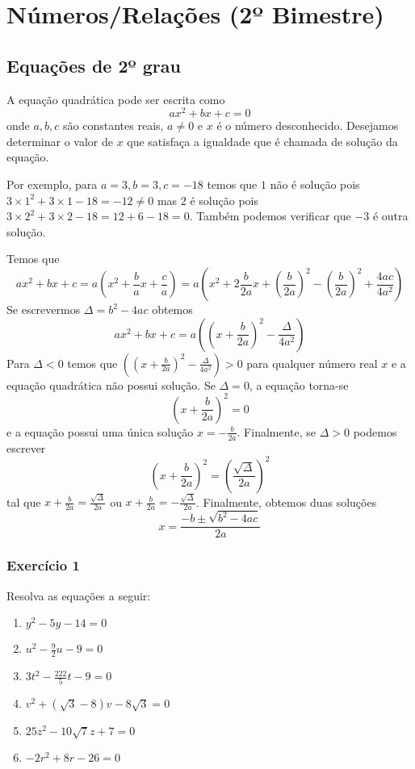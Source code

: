 \chapter{Números/Relações (2º Bimestre)}

\section{Equações de 2º grau}

A equação quadrática pode ser escrita como
$$a x^2 + b x + c = 0$$
onde $a, b, c$ são constantes reais,
$a \neq 0$ e $x$ é o número desconhecido.
Desejamos determinar o valor de $x$ que satisfaça a igualdade
que é chamada de solução da equação.

Por exemplo,
para $a=3, b=3, c=-18$ temos que
$1$ não é solução pois
$3 \times 1^2 + 3 \times 1 - 18 = -12 \neq 0$
mas $2$ é solução pois $3 \times 2^2 + 3 \times 2 - 18 = 12 + 6 - 18 = 0$.
Também podemos verificar que $-3$ é outra solução.

Temos que
$$a x^2 + b x + c =
a \left( x^2 + \frac{b}{a} x + \frac{c}{a} \right) =
a \left( x^2 + 2 \frac{b}{2a} x + \left(\frac{b}{2a}\right)^2
- \left(\frac{b}{2a}\right)^2 + \frac{4ac}{4a^2} \right)
$$
Se escrevermos $\Delta = b^2 - 4ac$ obtemos
$$a x^2 + b x + c =
a \left( \left(x + \frac{b}{2a}\right)^2 - \frac{\Delta}{4a^2} \right)$$
Para $\Delta < 0$ temos que
$\left( \left(x + \frac{b}{2a}\right)^2 - \frac{\Delta}{4a^2} \right) > 0$
para qualquer número real $x$ e a equação quadrática não possui solução.
Se $\Delta = 0$, a equação torna-se
$$\left(x + \frac{b}{2a}\right)^2 = 0$$
e a equação possui uma única solução $x = -\frac{b}{2a}$.
Finalmente, se $\Delta > 0$  podemos escrever
$$\left(x + \frac{b}{2a}\right)^2 = \left(\frac{\sqrt{\Delta}}{2a}\right)^2$$
tal que $x + \frac{b}{2a} = \frac{\sqrt{\Delta}}{2a}$ ou
$x + \frac{b}{2a} = -\frac{\sqrt{\Delta}}{2a}$.
Finalmente, obtemos duas soluções
$$x = \frac{-b \pm \sqrt{b^2 - 4ac}}{2a}$$

\subsection*{Exercício 1}

Resolva as equações a seguir:

\begin{enumerate}
\item $y^2 - 5y - 14 = 0$
\item $u^2 - \frac{9}{2}u - 9 = 0$
\item $3t^2 - \frac{222}{5}t - 9 = 0$
\item $v^2 + {(\sqrt3 - 8)}v - 8\sqrt3 = 0$
\item $25z^2  - 10\sqrt7 z  + 7 = 0$
\item $-2r^2 + 8r - 26 = 0$
\end{enumerate}

